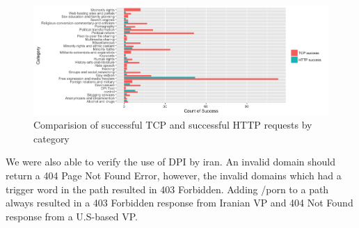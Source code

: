 \begin{figure}
 \centerline{\includegraphics[width=.9\textwidth,keepaspectratio]{pictures/TCPcompareHTTP.png}}
  \caption{Comparision of successful TCP and successful HTTP requests by category}
  \label{fig:TCPcomapreHTTP}
\end{figure}
We were also able to verify the use of DPI by iran. An invalid domain should return a 404 Page Not Found Error, however, the invalid domains which had a trigger word in the path resulted in 403 Forbidden. Adding /porn to a path always resulted in a 403 Forbidden response from Iranian VP and 404 Not Found response from a U.S-based VP. \\ 



